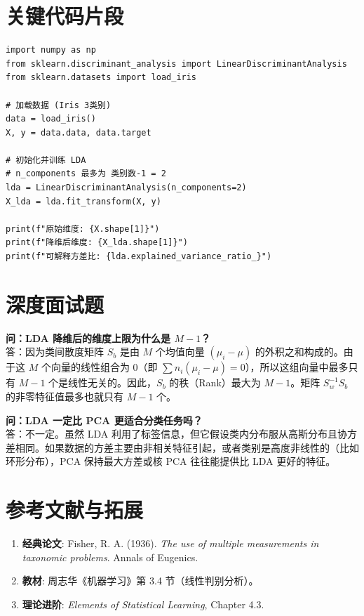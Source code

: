 \documentclass[12pt, a4paper]{article}
\begin{document}
\section{关键代码片段}
\begin{lstlisting}
import numpy as np
from sklearn.discriminant_analysis import LinearDiscriminantAnalysis
from sklearn.datasets import load_iris

# 加载数据 (Iris 3类别)
data = load_iris()
X, y = data.data, data.target

# 初始化并训练 LDA
# n_components 最多为 类别数-1 = 2
lda = LinearDiscriminantAnalysis(n_components=2)
X_lda = lda.fit_transform(X, y)

print(f"原始维度: {X.shape[1]}")
print(f"降维后维度: {X_lda.shape[1]}")
print(f"可解释方差比: {lda.explained_variance_ratio_}")
\end{lstlisting}

\section{深度面试题}

\textbf{问：LDA 降维后的维度上限为什么是 $M-1$？}\\
答：因为类间散度矩阵 $S_b$ 是由 $M$ 个均值向量 $(\mu_i - \mu)$ 的外积之和构成的。由于这 $M$ 个向量的线性组合为 0（即 $\sum n_i(\mu_i - \mu) = 0$），所以这组向量中最多只有 $M-1$ 个是线性无关的。因此，$S_b$ 的秩（Rank）最大为 $M-1$。矩阵 $S_w^{-1} S_b$ 的非零特征值最多也就只有 $M-1$ 个。

\textbf{问：LDA 一定比 PCA 更适合分类任务吗？}\\
答：不一定。虽然 LDA 利用了标签信息，但它假设类内分布服从高斯分布且协方差相同。如果数据的方差主要由非相关特征引起，或者类别是高度非线性的（比如环形分布），PCA 保持最大方差或核 PCA 往往能提供比 LDA 更好的特征。

\section{参考文献与拓展}
\begin{enumerate}
    \item \textbf{经典论文}: Fisher, R. A. (1936). \textit{The use of multiple measurements in taxonomic problems}. Annals of Eugenics.
    \item \textbf{教材}: 周志华《机器学习》第 3.4 节（线性判别分析）。
    \item \textbf{理论进阶}: \textit{Elements of Statistical Learning}, Chapter 4.3.
\end{enumerate}
\end{document}
